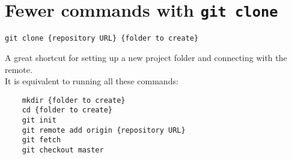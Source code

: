 \section{Fewer commands with \texttt{git clone}}

\texttt{git clone \{repository URL\} \{folder to create\}}

A great shortcut for setting up a new project folder and connecting with the remote.
\\
It is equivalent to running all these commands:

\begin{verbatim}
    mkdir {folder to create}
    cd {folder to create}
    git init
    git remote add origin {repository URL}
    git fetch
    git checkout master
\end{verbatim}